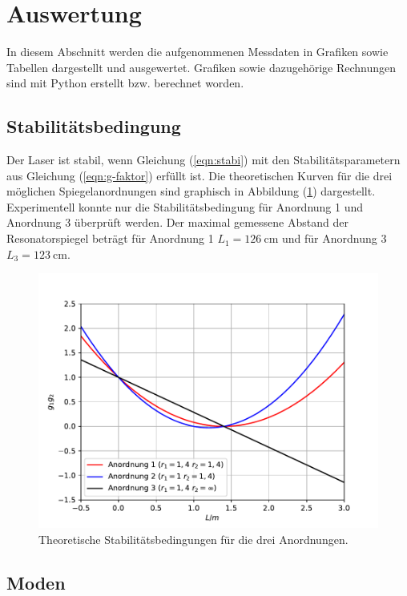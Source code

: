 \newpage
\section{Auswertung}
\label{sec:Auswertung}
In diesem Abschnitt werden die aufgenommenen Messdaten in Grafiken sowie Tabellen dargestellt und ausgewertet. Grafiken sowie dazugehörige Rechnungen sind mit Python \cite{python} erstellt bzw. berechnet worden.
\subsection{Stabilitätsbedingung}
\label{sec:stab}

Der Laser ist stabil, wenn Gleichung (\ref{eqn:stabi}) mit den Stabilitätsparametern aus Gleichung (\ref{eqn:g-faktor}) erfüllt ist.
Die theoretischen Kurven für die drei möglichen Spiegelanordnungen sind graphisch in Abbildung (\ref{fig:plot1}) dargestellt.
Experimentell konnte nur die Stabilitätsbedingung für Anordnung 1 und Anordnung 3 überprüft werden.
Der maximal gemessene Abstand der Resonatorspiegel beträgt für Anordnung 1 $L_\mathrm{1} = \SI{126}{\centi\meter}$ und für Anordnung 3 $L_\mathrm{3} = \SI{123}{\centi\meter}$.

\begin{figure}
  \centering
  \includegraphics[scale=0.7]{fig/plot1.pdf}
  \caption{Theoretische Stabilitätsbedingungen für die drei Anordnungen.}
  \label{fig:plot1}
\end{figure}

\FloatBarrier
\subsection{Moden}
\label{sec:tem}

